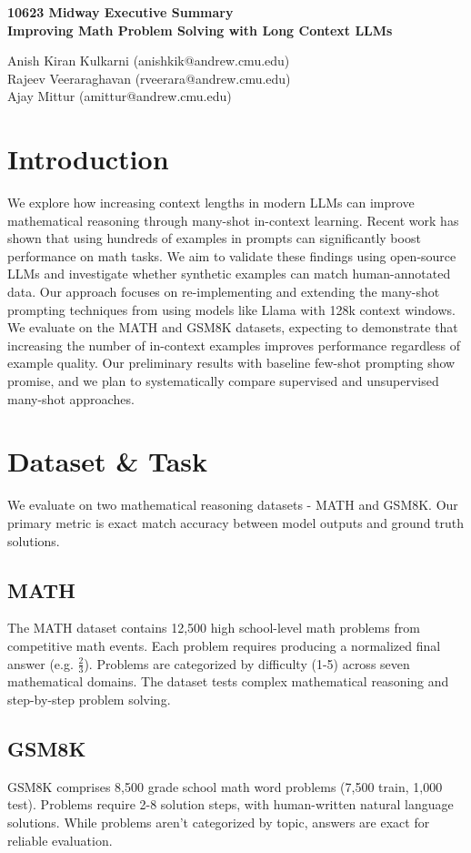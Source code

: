 \documentclass{article}
\title{\textbf{}}
\author{}
\date{}
\begin{document}
\Large
\noindent
\textbf{10623 Midway Executive Summary}\\
\textbf{Improving Math Problem Solving with Long Context LLMs}

\normalsize
\noindent
Anish Kiran Kulkarni (anishkik@andrew.cmu.edu) \\ 
Rajeev Veeraraghavan (rveerara@andrew.cmu.edu)\\
Ajay Mittur (amittur@andrew.cmu.edu)

\section{Introduction}
We explore how increasing context lengths in modern LLMs can improve mathematical reasoning through many-shot in-context learning. Recent work has shown that using hundreds of examples in prompts can significantly boost performance on math tasks. We aim to validate these findings using open-source LLMs and investigate whether synthetic examples can match human-annotated data. Our approach focuses on re-implementing and extending the many-shot prompting techniques from \cite{agarwal2024manyshotincontextlearning} using models like Llama with 128k context windows. We evaluate on the MATH and GSM8K datasets, expecting to demonstrate that increasing the number of in-context examples improves performance regardless of example quality. Our preliminary results with baseline few-shot prompting show promise, and we plan to systematically compare supervised and unsupervised many-shot approaches.

\section{Dataset \& Task}
We evaluate on two mathematical reasoning datasets - MATH and GSM8K. Our primary metric is exact match accuracy between model outputs and ground truth solutions.

\subsection{MATH}
The MATH dataset \cite{hendrycksmath2021} contains 12,500 high school-level math problems from competitive math events. Each problem requires producing a normalized final answer (e.g. $\frac{2}{3}$). Problems are categorized by difficulty (1-5) across seven mathematical domains. The dataset tests complex mathematical reasoning and step-by-step problem solving.

\subsection{GSM8K} 
GSM8K \cite{cobbe2021gsm8k} comprises 8,500 grade school math word problems (7,500 train, 1,000 test). Problems require 2-8 solution steps, with human-written natural language solutions. While problems aren't categorized by topic, answers are exact for reliable evaluation.
\end{document}
